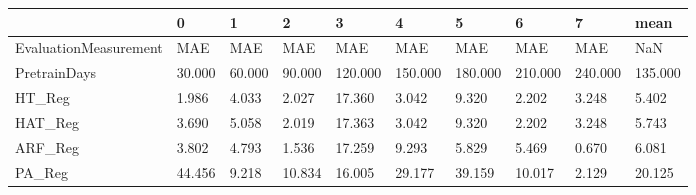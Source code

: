 \begin{tabular}{llllllllll}
\toprule
{} &      0 &      1 &      2 &       3 &       4 &       5 &       6 &       7 &    mean \\
\midrule
EvaluationMeasurement &    MAE &    MAE &    MAE &     MAE &     MAE &     MAE &     MAE &     MAE &     NaN \\
PretrainDays          & 30.000 & 60.000 & 90.000 & 120.000 & 150.000 & 180.000 & 210.000 & 240.000 & 135.000 \\
HT\_Reg                &  1.986 &  4.033 &  2.027 &  17.360 &   3.042 &   9.320 &   2.202 &   3.248 &   5.402 \\
HAT\_Reg               &  3.690 &  5.058 &  2.019 &  17.363 &   3.042 &   9.320 &   2.202 &   3.248 &   5.743 \\
ARF\_Reg               &  3.802 &  4.793 &  1.536 &  17.259 &   9.293 &   5.829 &   5.469 &   0.670 &   6.081 \\
PA\_Reg                & 44.456 &  9.218 & 10.834 &  16.005 &  29.177 &  39.159 &  10.017 &   2.129 &  20.125 \\
\bottomrule
\end{tabular}
